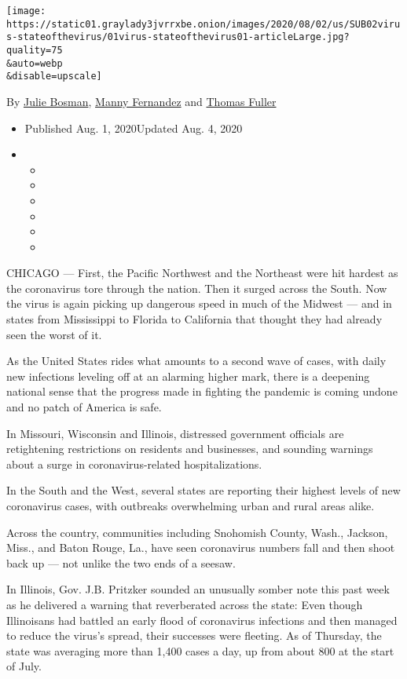 \texttt{[image: https://static01.graylady3jvrrxbe.onion/images/2020/08/02/us/SUB02virus-stateofthevirus/01virus-stateofthevirus01-articleLarge.jpg?quality=75\\\&auto=webp\\\&disable=upscale]}

By \href{https://www.nytimes3xbfgragh.onion/by/julie-bosman}{Julie
Bosman},
\href{https://www.nytimes3xbfgragh.onion/by/manny-fernandez}{Manny
Fernandez} and
\href{https://www.nytimes3xbfgragh.onion/by/thomas-fuller}{Thomas
Fuller}

\begin{itemize}
\item
  Published Aug. 1, 2020Updated Aug. 4, 2020
\item
  \begin{itemize}
  \item
  \item
  \item
  \item
  \item
  \item
  \end{itemize}
\end{itemize}

CHICAGO --- First, the Pacific Northwest and the Northeast were hit
hardest as the coronavirus tore through the nation. Then it surged
across the South. Now the virus is again picking up dangerous speed in
much of the Midwest --- and in states from Mississippi to Florida to
California that thought they had already seen the worst of it.

As the United States rides what amounts to a second wave of cases, with
daily new infections leveling off at an alarming higher mark, there is a
deepening national sense that the progress made in fighting the pandemic
is coming undone and no patch of America is safe.

In Missouri, Wisconsin and Illinois, distressed government officials are
retightening restrictions on residents and businesses, and sounding
warnings about a surge in coronavirus-related hospitalizations.

In the South and the West, several states are reporting their highest
levels of new coronavirus cases, with outbreaks overwhelming urban and
rural areas alike.

Across the country, communities including Snohomish County, Wash.,
Jackson, Miss., and Baton Rouge, La., have seen coronavirus numbers fall
and then shoot back up --- not unlike the two ends of a seesaw.

In Illinois, Gov. J.B. Pritzker sounded an unusually somber note this
past week as he delivered a warning that reverberated across the state:
Even though Illinoisans had battled an early flood of coronavirus
infections and then managed to reduce the virus's spread, their
successes were fleeting. As of Thursday, the state was averaging more
than 1,400 cases a day, up from about 800 at the start of July.

